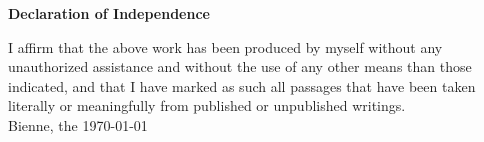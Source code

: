 \documentclass[12pt,a4paper]{scrartcl}
\begin{document}
\markboth{}{}

\newpage





\newpage
\thispagestyle{empty}
\markboth{}{}
  \normalsize
\begin{center}
\huge{\textbf{ Declaration of Independence}}\\[40mm]
\end{center}
\large
I affirm that the above work has been produced by myself without any unauthorized assistance and without the use of any other means than those indicated, and that I have marked as such all passages that have been taken literally or meaningfully from published or unpublished writings.\\[50mm]
Bienne, the \today

\newpage
\end{document}
